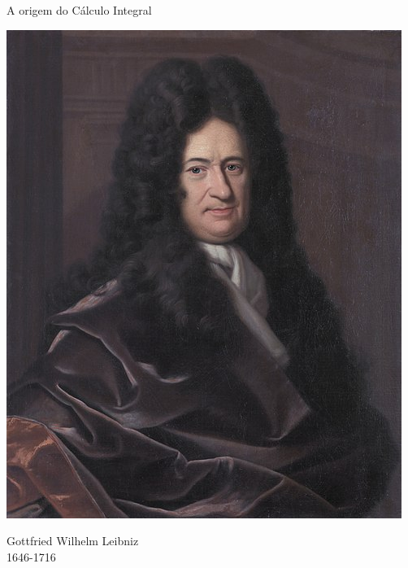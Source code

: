 \begin{frame}[label=area-circulo]{A origem do Cálculo Integral}
\begin{center}
\begin{minipage}{0.4\textwidth}
\begin{center}
	\includegraphics[scale=0.2]{leibniz.jpg}

			{\scriptsize Gottfried Wilhelm Leibniz \\  1646-1716 }
\end{center}
	\end{minipage}
	\end{center}
\end{frame}



